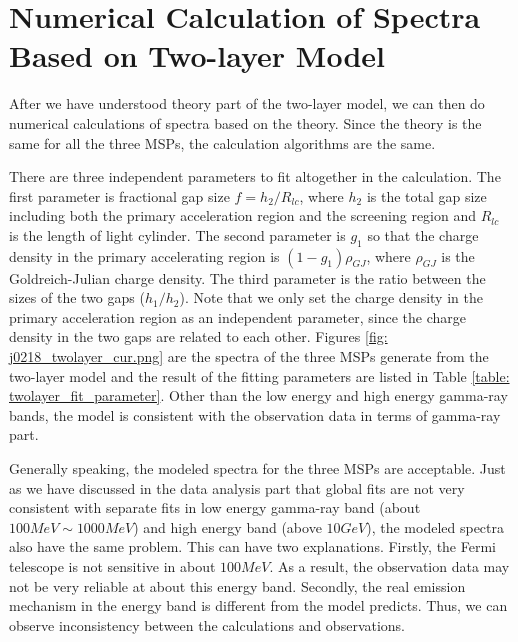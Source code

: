 \documentclass[12pt]{report}
\begin{document}
        \section{Numerical Calculation of Spectra Based on Two-layer Model}
          After we have understood theory part of the two-layer model, we can then do numerical 
          calculations of spectra 
          based on the theory. Since the theory is the same for all the three MSPs, the calculation 
          algorithms are the same. 

          There are three independent parameters to fit altogether in the calculation. 
          The first parameter is fractional gap size $f=h_{2}/R_{lc}$, where $h_{2}$ is the 
          total gap size including both the primary acceleration region and the screening region 
          and $R_{lc}$ is the length of light cylinder. The second parameter is $g_{1}$ so that
          the charge density in the primary accelerating region is $\left(1-g_{1}\right) \rho_{GJ}$, 
          where $\rho_{GJ}$ is the Goldreich-Julian charge density. The third parameter is the ratio 
          between the sizes of the two gaps ($h_{1}/h_{2}$). Note that we only set the charge density in the primary acceleration region as an 
          independent parameter, since the charge density in the two gaps are related to each 
          other. Figures \ref{fig: j0218_twolayer_cur.png} are the spectra of the three MSPs generate 
          from the two-layer model and the result of the fitting parameters are listed in Table 
          \ref{table: twolayer_fit_parameter}. Other than the low energy and high energy gamma-ray bands, 
          the model is consistent with the observation data in terms of gamma-ray part. 

          Generally speaking, the modeled spectra for the three MSPs are acceptable. Just as 
          we have discussed in the data analysis part that global fits are not very consistent 
          with separate fits in low energy gamma-ray band (about $100MeV\sim 1000MeV$) and high energy
          band (above $10GeV$), the modeled spectra also have the same problem. 
          This can have two explanations. Firstly, the Fermi telescope is not sensitive in about $100 MeV$.
          As a result, the observation data may not be very reliable at about this energy band. Secondly, the  
          real emission mechanism in the energy band is different from the model predicts. Thus, we can observe 
          inconsistency between the calculations and observations.
 
\end{document}
